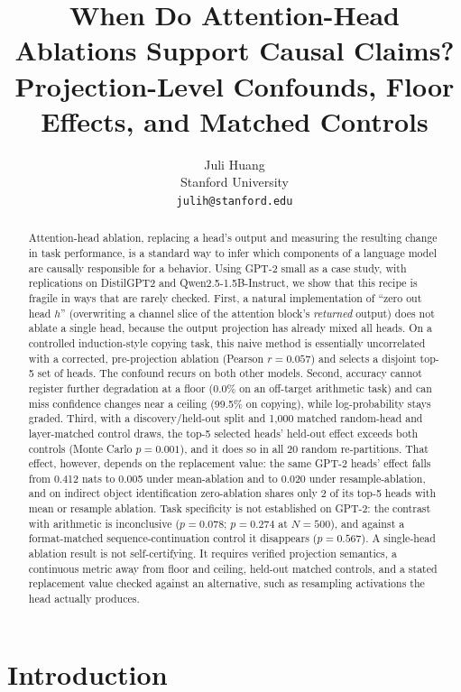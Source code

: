 \documentclass{article}
\title{When Do Attention-Head Ablations Support Causal Claims? \\
Projection-Level Confounds, Floor Effects, and Matched Controls}
\author{%
  Juli Huang \\
  Stanford University \\
  \texttt{julih@stanford.edu}
}
\begin{document}
\maketitle


\begin{abstract}
Attention-head ablation, replacing a head's output and measuring the
resulting change in task performance, is a standard way to infer which
components of a language model are causally responsible for a behavior.
Using GPT-2 small as a case study, with replications on DistilGPT2 and
Qwen2.5-1.5B-Instruct, we show that this recipe is fragile in ways that
are rarely checked. First, a natural implementation of ``zero out head
$h$'' (overwriting a channel slice of the attention block's
\emph{returned} output) does not ablate a single head, because the
output projection has already mixed all heads. On a controlled
induction-style copying task, this naive method is essentially
uncorrelated with a corrected, pre-projection ablation (Pearson
$r=0.057$) and selects a disjoint top-5 set of heads. The confound
recurs on both other models. Second, accuracy cannot register further
degradation at a floor (0.0\% on an off-target arithmetic task) and can
miss confidence changes near a ceiling (99.5\% on copying), while
log-probability stays graded. Third, with a discovery/held-out split and
1{,}000 matched random-head and layer-matched control draws, the top-5
selected heads' held-out effect exceeds both controls (Monte Carlo
$p=0.001$), and it does so in all 20 random re-partitions. That effect,
however, depends on the replacement value: the same GPT-2 heads' effect
falls from 0.412 nats to 0.005 under mean-ablation and to 0.020 under
resample-ablation, and on indirect object identification zero-ablation
shares only 2 of its top-5 heads with mean or resample ablation. Task specificity is not established on
GPT-2: the contrast with arithmetic is inconclusive ($p=0.078$;
$p=0.274$ at $N=500$), and against a format-matched sequence-continuation
control it disappears ($p=0.567$). A single-head ablation result is not
self-certifying. It requires verified projection semantics, a continuous
metric away from floor and ceiling, held-out matched controls, and a
stated replacement value checked against an alternative, such as
resampling activations the head actually produces.
\end{abstract}


\section{Introduction}
\label{sec:intro}
\end{document}
